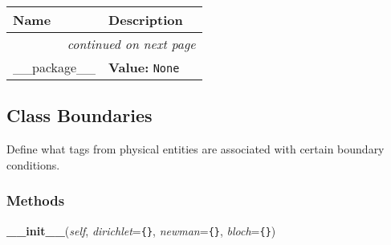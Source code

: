     \vspace{-1cm}
\hspace{\varindent}\begin{longtable}{|p{\varnamewidth}|p{\vardescrwidth}|l}
\cline{1-2}
\cline{1-2} \centering \textbf{Name} & \centering \textbf{Description}& \\
\cline{1-2}
\endhead\cline{1-2}\multicolumn{3}{r}{\small\textit{continued on next page}}\\\endfoot\cline{1-2}
\endlastfoot\raggedright \_\-\_\-p\-a\-c\-k\-a\-g\-e\-\_\-\_\- & \raggedright \textbf{Value:} 
{\tt None}&\\
\cline{1-2}
\end{longtable}



\subsection{Class Boundaries}

    \label{Classes:Boundaries}
Define what tags from physical entities are associated with certain 
boundary conditions.



  \subsubsection{Methods}

    \label{Classes:Boundaries:__init__}

    \vspace{0.5ex}

\hspace{.8\funcindent}\begin{boxedminipage}{\funcwidth}

    \raggedright \textbf{\_\_init\_\_}(\textit{self}, \textit{dirichlet}={\tt \texttt{\{}\texttt{\}}}, \textit{newman}={\tt \texttt{\{}\texttt{\}}}, \textit{bloch}={\tt \texttt{\{}\texttt{\}}})

\setlength{\parskip}{2ex}
\setlength{\parskip}{1ex}
    \end{boxedminipage}

